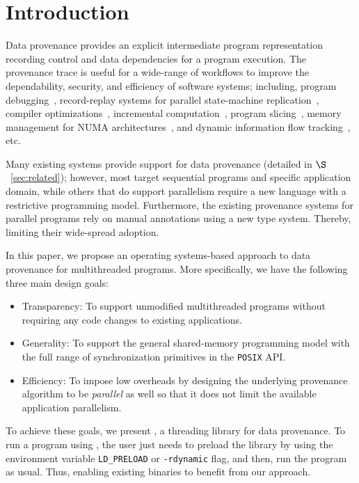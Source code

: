 \section{Introduction}
\label{sec:introduction}

Data provenance provides an explicit intermediate program representation recording control and data dependencies for a program execution.  The provenance trace is useful for a wide-range of workflows to improve the dependability, security, and efficiency of software systems; including, program debugging~\cite{fast-track-pldi}, record-replay systems for parallel state-machine replication~\cite{rex},  compiler optimizations~\cite{pgo}, incremental computation~\cite{ithreads}, program slicing~\cite{roly}, memory management for NUMA architectures~\cite{memprof}, and dynamic information flow tracking~\cite{dift}, etc. 

Many existing systems provide support for data provenance (detailed in $\S$~\ref{sec:related}); however,
most target sequential programs and specific application domain, while others that do support parallelism require a new language with a restrictive programming model. Furthermore, the existing  provenance systems for parallel programs rely on manual annotations using a new type system. Thereby, limiting their wide-spread adoption.



In this paper, we propose an operating systems-based approach to data provenance for multithreaded programs. More specifically, we have the following three main design goals: 
\begin{itemize} 

\item Transparency: To support unmodified multithreaded programs without requiring any code changes to existing applications. 
\item Generality: To support the general shared-memory programming model with the  full range of synchronization primitives in the {\tt POSIX} API. 
\item Efficiency: To impose low overheads by designing the underlying provenance algorithm to be  {\em parallel} as well so that it does not limit the available application parallelism.

\end{itemize}

To achieve these goals, we present \projecttitle, a threading library for data provenance. To run a program using \projecttitle,  the user just needs to preload the \projecttitle library  by using the environment variable {\tt LD\_PRELOAD} or {\tt -rdynamic} flag, and then, run the program as usual. Thus, enabling existing binaries to benefit from our approach. 


